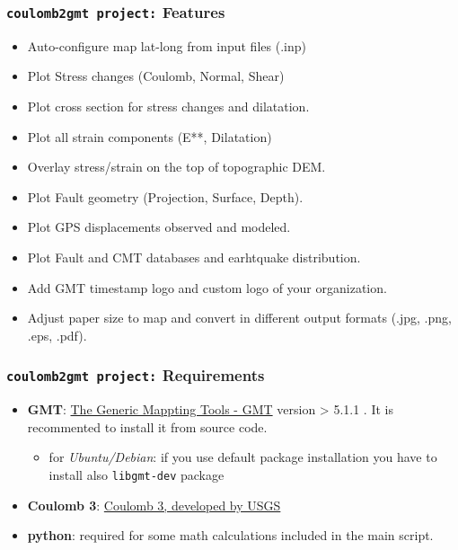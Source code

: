\begin{frame}
\frametitle{\texttt{coulomb2gmt project:} Features}


\begin{itemize}
\item Auto-configure map lat-long from input files (.inp)
\item
  Plot Stress changes (Coulomb, Normal, Shear)
\item
  Plot cross section for stress changes and dilatation.
\item
  Plot all strain components (E**, Dilatation)
\item
  Overlay stress/strain on the top of topographic DEM.
\item
  Plot Fault geometry (Projection, Surface, Depth).
\item
  Plot GPS displacements observed and modeled.
\item
  Plot Fault and CMT databases and earhtquake distribution.
\item
  Add GMT timestamp logo and custom logo of your organization.
\item
  Adjust paper size to map and convert in different output formats
  (.jpg, .png, .eps, .pdf).
\end{itemize}

\end{frame}

\begin{frame}
\frametitle{\texttt{coulomb2gmt project:} Requirements}

\begin{itemize}
\item
  \textbf{GMT}: \href{http://gmt.soest.hawaii.edu/}{The Generic Mappting
  Tools - GMT} version \textgreater{} 5.1.1 . It is recommented to
  install it from source code.

  \begin{itemize}
  \item
    for \emph{Ubuntu/Debian}: if you use default package installation
    you have to install also \texttt{libgmt-dev} package
  \end{itemize}
\item
  \textbf{Coulomb 3}:
  \href{https://earthquake.usgs.gov/research/software/coulomb/}{Coulomb
  3, developed by USGS}
\item
  \textbf{python}: required for some math calculations included in the
  main script.
\end{itemize}
\end{frame}

